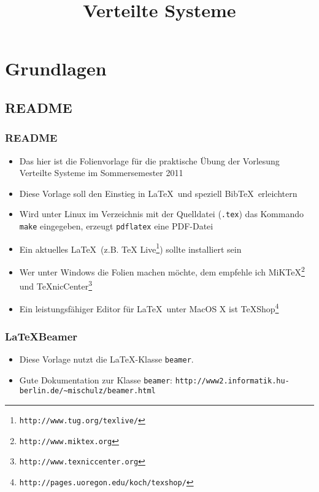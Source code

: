 \documentclass{beamer}
\title[]{Verteilte Systeme\\ \ort}
\author{\autor}
\institute{Fakultät für Informatik\\
           Hochschule Mannheim\\
          \texttt{cray@unix-ag.uni-kl.de}}
\date{\datum}
\begin{document}
\begin{frame}
\titlepage
\end{frame}



\section{Grundlagen}

\subsection{README}

\begin{frame}[fragile]
\frametitle{README}
\begin{itemize}
\item Das hier ist die Folienvorlage für die praktische Übung der Vorlesung Verteilte Systeme im Sommersemester 2011
\item Diese Vorlage soll den Einstieg in \LaTeX\ und speziell Bib\TeX\ erleichtern
\item Wird unter Linux im Verzeichnis mit der Quelldatei (\texttt{.tex}) das Kommando \texttt{make} eingegeben, erzeugt \verb!pdflatex! eine PDF-Datei
\item Ein aktuelles \LaTeX\ (z.B. TeX Live\footnote{\texttt{http://www.tug.org/texlive/}}) sollte installiert sein
\item Wer unter Windows die Folien machen möchte, dem empfehle ich MiK\TeX\footnote{\texttt{http://www.miktex.org}} und \TeX nicCenter\footnote{\texttt{http://www.texniccenter.org}}
\item Ein leistungsfähiger Editor für \LaTeX\ unter MacOS X ist TeXShop\footnote{\texttt{http://pages.uoregon.edu/koch/texshop/}}
\end{itemize}
\end{frame}

\begin{frame}[fragile]
\frametitle{\LaTeX Beamer}
\begin{itemize}
\item Diese Vorlage nutzt die \LaTeX-Klasse \texttt{beamer}.
\item Gute Dokumentation zur Klasse \texttt{beamer}:
\verb!http://www2.informatik.hu-berlin.de/~mischulz/beamer.html!
\end{itemize}
\end{frame}
\end{document}
